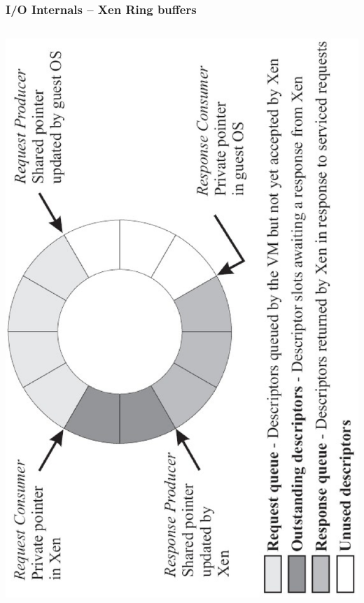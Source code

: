 \documentclass[red,slidestop,notes,compress,mathserif]{beamer}
\begin{document}
\begin{frame}
\frametitle{I/O Internals -- Xen Ring buffers}
\begin{columns}
\column{\textwidth}
\includegraphics[width=.6\textwidth,angle=-90]{figs/bare/test.eps}
\end{columns}
\end{frame}
\end{document}

